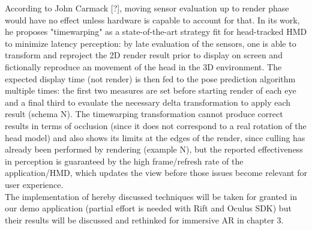 According to John Carmack [?], moving sensor evaluation up to render phase would have no effect unless hardware is capable to account for that. In its work, he proposes "timewarping" as a state-of-the-art strategy fit for head-tracked HMD to minimize latency perception: by late evaluation of the sensors, one is able to transform and reproject the 2D render result prior to display on screen and fictionally reproduce an movement of the head in the 3D environment. The expected display time (not render) is then fed to the pose prediction algorithm multiple times: the first two measures are set before starting render of each eye and a final third to evaulate the necessary delta transformation to apply each result (schema N). The timewarping transformation cannot produce correct results in terms of occlusion (since it does not correspond to a real rotation of the head model) and also shows its limits at the edges of the render, since culling has already been performed by rendering (example N), but the reported effectiveness in perception is guaranteed by the high frame/refresh rate of the application/HMD, which updates the view before those issues become relevant for user experience.\\
The implementation of hereby discussed techniques will be taken for granted in our demo application (partial effort is needed with Rift and Oculus SDK) but their results will be discussed and rethinked for immersive AR in chapter 3.










